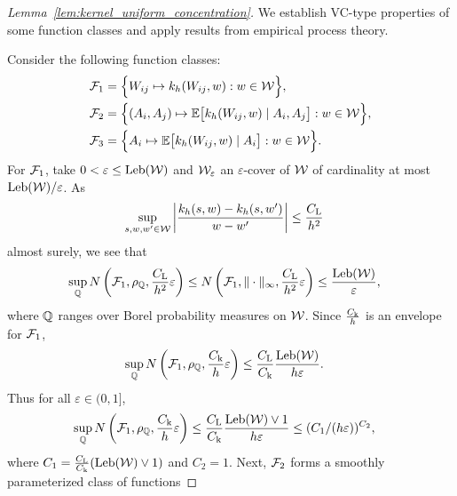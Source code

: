 \begin{proof}[Lemma~\ref{lem:kernel_uniform_concentration}]

  We establish VC-type properties of some function
  classes and apply results from empirical process theory.


  Consider the following function classes:
  \begin{align*}
    \mathcal{F}_1
    &=
    \Big\{
      W_{i j} \mapsto
      k_h(W_{i j},w)
      : w \in \mathcal{W}
    \Big\}, \\
    \mathcal{F}_2
    &=
    \Big\{
      (A_i, A_j) \mapsto
      \mathbb{E}\big[ k_h(W_{i j},w) \mid A_i, A_j \big]
      : w \in \mathcal{W}
    \Big\}, \\
    \mathcal{F}_3
    &=
    \Big\{
      A_i \mapsto
      \mathbb{E}\big[ k_h(W_{i j},w) \mid A_i \big]
      : w \in \mathcal{W}
    \Big\}.
  \end{align*}
  For $\mathcal{F}_1$, take $0 < \varepsilon \leq \operatorname{Leb}(\mathcal{W})$
  and $\mathcal{W}_\varepsilon$ an $\varepsilon$-cover of $\mathcal{W}$
  of cardinality at most $\operatorname{Leb}(\mathcal{W})/\varepsilon$. As
  \begin{align*}
    \sup_{s, w, w' \in \mathcal{W}}
    \left|
    \frac{k_h(s,w) - k_h(s,w')}
    {w-w'}
    \right|
    &\leq
    \frac{C_\mathrm{L}}{h^2}
  \end{align*}
  almost surely,
  we see that
  \begin{align*}
    \sup_{\mathbb{Q}}
    N\left(\mathcal{F}_1, \rho_{\mathbb{Q}},
    \frac{C_\mathrm{L}}{h^2} \varepsilon \right)
    &\leq
    N\left(\mathcal{F}_1, \|\cdot\|_\infty,
    \frac{C_\mathrm{L}}{h^2} \varepsilon \right)
    \leq
    \frac{\operatorname{Leb}(\mathcal{W})}{\varepsilon},
  \end{align*}
  where $\mathbb{Q}$ ranges over Borel
  probability measures on $\mathcal{W}$.
  Since
  $\frac{C_{\mathrm{k}}}{h}$
  is an envelope for $\mathcal{F}_1$,
  \begin{align*}
    \sup_{\mathbb{Q}}
    N\left(\mathcal{F}_1, \rho_{\mathbb{Q}},
    \frac{C_{\mathrm{k}}}{h} \varepsilon \right)
    &\leq
    \frac{C_{\mathrm{L}}}{C_{\mathrm{k}}}
    \frac{\operatorname{Leb}(\mathcal{W})}{h \varepsilon}.
  \end{align*}
  Thus for all $\varepsilon \in (0,1]$,
  \begin{align*}
    \sup_{\mathbb{Q}}
    N\left(\mathcal{F}_1, \rho_{\mathbb{Q}},
    \frac{C_{\mathrm{k}}}{h} \varepsilon \right)
    &\leq
    \frac{C_{\mathrm{L}}}{C_{\mathrm{k}}}
    \frac{\operatorname{Leb}(\mathcal{W}) \vee 1}{h \varepsilon}
    \leq
    (C_1/(h\varepsilon))^{C_2},
  \end{align*}
  where
  $C_1 = \frac{C_{\mathrm{L}}}{C_{\mathrm{k}}} (\operatorname{Leb}(\mathcal{W}) \vee 1)$
  and $C_2 = 1$.
  Next, $\mathcal{F}_2$ forms a smoothly parameterized class of functions

\end{proof}
